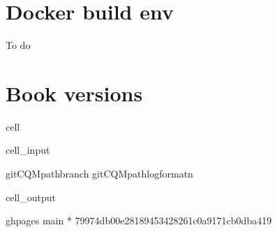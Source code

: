 \documentclass[letterpaper,table,10pt,english]{jupyterBook}
\begin{document}
\section{Docker build env}
\label{\detokenize{tests/build_versions_checks:docker-build-env}}
\sphinxAtStartPar
To do


\section{Book versions}
\label{\detokenize{tests/build_versions_checks:book-versions}}
\begin{sphinxuseclass}{cell}\begin{sphinxVerbatimInput}

\begin{sphinxuseclass}{cell_input}
\begin{sphinxVerbatim}[commandchars=\\\{\}]
  
git\PYGZhy{}CQMpathbranch
git\PYGZhy{}CQMpathlog\PYGZhy{}\PYGZhy{}format\PYGZhy{}n
\end{sphinxVerbatim}

\end{sphinxuseclass}\end{sphinxVerbatimInput}
\begin{sphinxVerbatimOutput}

\begin{sphinxuseclass}{cell_output}
\begin{sphinxVerbatim}[commandchars=\\\{\}]
  gh\PYGZhy{}pages
  main
* 
79974db00e28189453428261c0a9171cb0dba419
\end{sphinxVerbatim}

\end{sphinxuseclass}\end{sphinxVerbatimOutput}

\end{sphinxuseclass}
\end{document}
